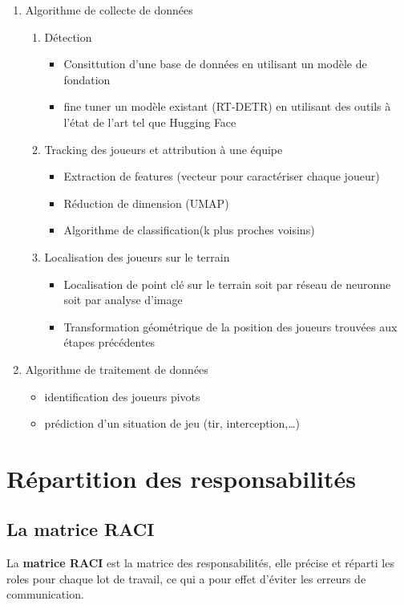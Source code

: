 \begin{enumerate}
    \item Algorithme de collecte de données
\begin{enumerate}
    \item Détection 
    \begin{itemize}
    \item Consittution d'une base de données en utilisant un modèle de fondation 
    \item fine tuner un modèle existant (RT-DETR) en utilisant des outils à l'état de l'art tel que Hugging Face 
    \end{itemize}
    \item Tracking des joueurs et attribution à une équipe 
    \begin{itemize}
        \item Extraction de features (vecteur pour caractériser chaque joueur)
        \item Réduction de dimension (UMAP) 
        \item Algorithme de classification(k plus proches voisins)
    \end{itemize}
    \item Localisation des joueurs sur le terrain 
    \begin{itemize}
        \item Localisation de point clé sur le terrain soit par réseau de neuronne soit par analyse d'image 
        \item Transformation géométrique de la position des joueurs trouvées aux étapes précédentes
    \end{itemize}
\end{enumerate}
\item Algorithme de traitement de données
\begin{itemize}
    \item identification des joueurs pivots 
    \item prédiction d'un situation de jeu (tir, interception,\dots)
\end{itemize}
\end{enumerate}
\clearpage
\section{Répartition des responsabilités}

\subsection{La matrice RACI}
La \textbf{matrice RACI} est la matrice des responsabilités, elle précise et réparti les roles pour chaque lot de travail, ce qui a pour effet d'éviter les erreurs de communication.

